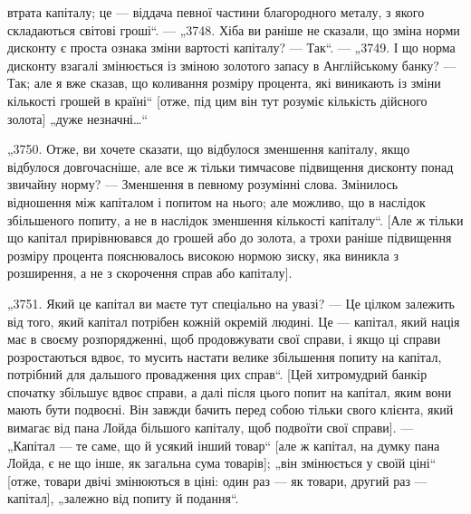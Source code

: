 \parcont{}  %
втрата капіталу; це — віддача певної частини благородного металу, з якого складаються світові
гроші“. — „3748. Хіба ви раніше
не сказали, що зміна норми дисконту є проста ознака зміни вартості капіталу? — Так“. — „3749. І що
норма дисконту взагалі
змінюється із зміною золотого запасу в Англійському банку? —
Так; але я вже сказав, що коливання розміру процента, які виникають із зміни кількості грошей в
країні“ [отже, під цим він
тут розуміє кількість дійсного золота] „дуже незначні\dots{}“

„3750. Отже, ви хочете сказати, що відбулося зменшення капіталу, якщо відбулося довгочасніше, але
все ж тільки тимчасове підвищення дисконту понад звичайну норму? — Зменшення
в певному розумінні слова. Змінилось відношення між капіталом
і попитом на нього; але можливо, що в наслідок збільшеного
попиту, а не в наслідок зменшення кількості капіталу“. [Але ж
тільки що капітал прирівнювався до грошей або до золота, а трохи
раніше підвищення розміру процента пояснювалось високою нормою зиску, яка виникла з розширення, а не
з скорочення справ
або капіталу].

„3751. Який це капітал ви маєте тут спеціально на увазі? —
Це цілком залежить від того, який капітал потрібен кожній
окремій людині. Це — капітал, який нація має в своєму розпорядженні, щоб продовжувати свої справи, і
якщо ці справи розростаються вдвоє, то мусить настати велике збільшення попиту
на капітал, потрібний для дальшого провадження цих справ“. [Цей
хитромудрий банкір спочатку збільшує вдвоє справи, а далі після
цього попит на капітал, яким вони мають бути подвоєні. Він
завжди бачить перед собою тільки свого клієнта, який вимагає
від пана Лойда більшого капіталу, щоб подвоїти свої справи]. —
„Капітал — те саме, що й усякий інший товар“ [але ж капітал, на думку пана Лойда, є не що інше, як
загальна сума товарів]; „він змінюється у своїй ціні“ [отже, товари двічі змінюються
в ціні: один раз — як товари, другий раз — капітал], „залежно
від попиту й подання“.

